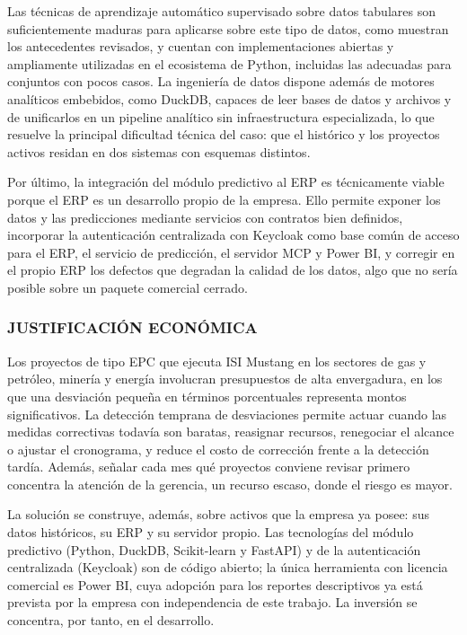 Las técnicas de aprendizaje automático supervisado sobre datos tabulares son suficientemente maduras para aplicarse sobre este tipo de datos, como muestran los antecedentes revisados, y cuentan con implementaciones abiertas y ampliamente utilizadas en el ecosistema de Python, incluidas las adecuadas para conjuntos con pocos casos. La ingeniería de datos dispone además de motores analíticos embebidos, como DuckDB, capaces de leer bases de datos y archivos y de unificarlos en un pipeline analítico sin infraestructura especializada, lo que resuelve la principal dificultad técnica del caso: que el histórico y los proyectos activos residan en dos sistemas con esquemas distintos.

Por último, la integración del módulo predictivo al ERP es técnicamente viable porque el ERP es un desarrollo propio de la empresa. Ello permite exponer los datos y las predicciones mediante servicios con contratos bien definidos, incorporar la autenticación centralizada con Keycloak como base común de acceso para el ERP, el servicio de predicción, el servidor MCP y Power BI, y corregir en el propio ERP los defectos que degradan la calidad de los datos, algo que no sería posible sobre un paquete comercial cerrado.

\subsubsection{JUSTIFICACIÓN ECONÓMICA}

Los proyectos de tipo EPC que ejecuta ISI Mustang en los sectores de gas y petróleo, minería y energía involucran presupuestos de alta envergadura, en los que una desviación pequeña en términos porcentuales representa montos significativos. La detección temprana de desviaciones permite actuar cuando las medidas correctivas todavía son baratas, reasignar recursos, renegociar el alcance o ajustar el cronograma, y reduce el costo de corrección frente a la detección tardía. Además, señalar cada mes qué proyectos conviene revisar primero concentra la atención de la gerencia, un recurso escaso, donde el riesgo es mayor.

La solución se construye, además, sobre activos que la empresa ya posee: sus datos históricos, su ERP y su servidor propio. Las tecnologías del módulo predictivo (Python, DuckDB, Scikit-learn y FastAPI) y de la autenticación centralizada (Keycloak) son de código abierto; la única herramienta con licencia comercial es Power BI, cuya adopción para los reportes descriptivos ya está prevista por la empresa con independencia de este trabajo. La inversión se concentra, por tanto, en el desarrollo.

